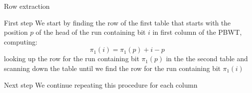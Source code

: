 \documentclass{beamer}
\begin{document}
\begin{frame}{Row extraction}
  \begin{block}{First step}
    We start by finding the row of the first table that starts with the position
    $p$ of the head of the run containing bit $i$ in first column of the PBWT,
    computing: 
    \pause
    \[\pi_1(i)=\pi_1(p)+i-p\]
    \pause
    looking up the row for the run containing bit $\pi_1(p)$ in the the second
    table and scanning down the table until we find the row for the run
    containing bit $\pi_1(i)$ 
  \end{block}
  \begin{block}{Next step}
    We continue repeating this procedure for each column
  \end{block}
  
\end{frame}
\end{document}
